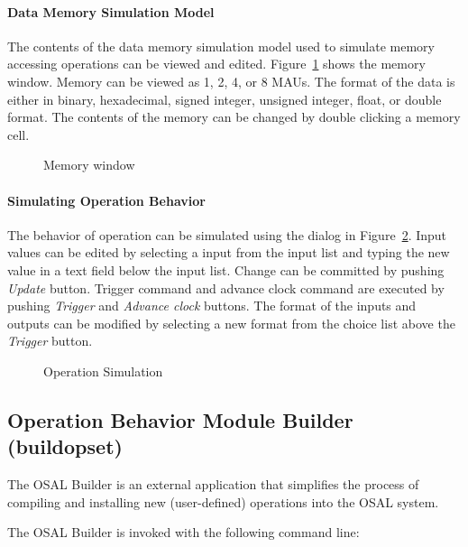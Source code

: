 \documentclass[twoside]{tceusermanual}
\begin{document}
\paragraph{Data Memory Simulation Model}

The contents of the data memory simulation model used to simulate
memory accessing operations can be viewed and edited.
Figure~\ref{fig:osed_memory_dialog}
shows the memory window. Memory can be viewed as 1, 2, 4, or 8 MAUs.
The format of the data is either in binary, hexadecimal, signed integer,
unsigned integer, float, or double format.
The contents of the memory can be changed by double clicking a memory cell. 

\begin{figure}[tb]
\centerline{}
\caption{Memory window}
\label{fig:osed_memory_dialog}
\end{figure}

\paragraph{Simulating Operation Behavior}

The behavior of operation can be simulated using the dialog in 
Figure~\ref{fig:osed_simulate_dialog}. Input values can be edited by selecting
a input from the input list and typing the new value in a text field below
the input list. Change can be committed by pushing \emph{Update} button.
Trigger command and advance clock command are executed 
by pushing \emph{Trigger} and \emph{Advance clock} buttons.
The format of the inputs and outputs can be modified by selecting a new format
from the choice list above the \emph{Trigger} button.

\begin{figure}[tb]
\centerline{}
\caption{Operation Simulation}
\label{fig:osed_simulate_dialog}
\end{figure}

\subsection{Operation Behavior Module Builder (buildopset)}
\label{sec:buildopset}

The OSAL Builder is an external application that simplifies the process of
compiling and installing new (user-defined) operations into the OSAL system.

The OSAL Builder is invoked with the following command line:
\end{document}
